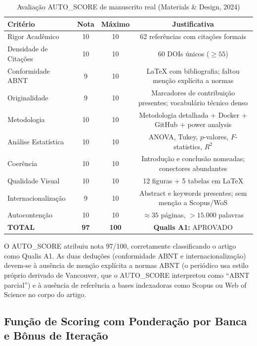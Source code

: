 \begin{table}[H]
\centering
\caption{Avaliação AUTO\_SCORE de manuscrito real (Materials \& Design, 2024)}
\label{tab:caso_real}
\begin{tabular}{l c c c}
\toprule
\textbf{Critério} & \textbf{Nota} & \textbf{Máximo} & \textbf{Justificativa} \\
\midrule
Rigor Acadêmico       & 10 & 10 & 62 referências com citações formais \\
Densidade de Citações & 10 & 10 & 60 DOIs únicos ($\geq 55$) \\
Conformidade ABNT     & 9  & 10 & LaTeX com bibliografia; faltou menção explícita a normas \\
Originalidade         & 9  & 10 & Marcadores de contribuição presentes; vocabulário técnico denso \\
Metodologia           & 10 & 10 & Metodologia detalhada + Docker + GitHub + power analysis \\
Análise Estatística   & 10 & 10 & ANOVA, Tukey, $p$-valores, $F$-statistics, $R^2$ \\
Coerência             & 10 & 10 & Introdução e conclusão nomeadas; conectores abundantes \\
Qualidade Visual      & 10 & 10 & 12 figuras + 5 tabelas em LaTeX \\
Internacionalização   & 9  & 10 & Abstract e keywords presentes; sem menção a Scopus/WoS \\
Autocontenção         & 10 & 10 & $\approx 35$ páginas, $> 15.000$ palavras \\
\midrule
\textbf{TOTAL}        & \textbf{97} & \textbf{100} & \textbf{Qualis A1:} APROVADO \\
\bottomrule
\end{tabular}
\end{table}

O AUTO\_SCORE atribuiu nota 97/100, corretamente classificando o
artigo como Qualis A1. As duas deduções (conformidade ABNT e
internacionalização) devem-se à ausência de menção explícita a
normas ABNT (o periódico usa estilo próprio derivado de Vancouver,
que o AUTO\_SCORE interpretou como ``ABNT parcial'') e à ausência
de referência a bases indexadoras como Scopus ou Web of Science no
corpo do artigo.

\subsection{Função de Scoring com Ponderação por Banca e Bônus de Iteração}
\label{sec:scoring_avancado}

